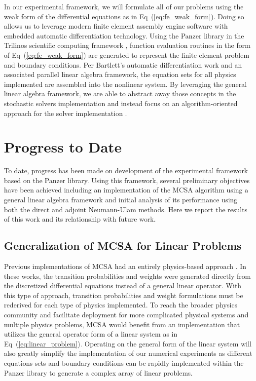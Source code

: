 In our experimental framework, we will formulate all of our problems
using the weak form of the differential equations as in
Eq~(\ref{eq:fe_weak_form}). Doing so allows us to leverage modern
finite element assembly engine software with embedded automatic
differentiation technology. Using the Panzer library in the Trilinos
scientific computing framework
\citep{notz_graph-based_2010,heroux_overview_2005}, function
evaluation routines in the form of Eq~(\ref{eq:fe_weak_form}) are
generated to represent the finite element problem and boundary
conditions. Per Bartlett's automatic differentiation work and an
associated parallel linear algebra framework, the equation sets for
all physics implemented are assembled into the nonlinear system. By
leveraging the general linear algebra framework, we are able to
abstract away those concepts in the stochastic solvers implementation
and instead focus on an algorithm-oriented approach for the solver
implementation \citep{musser_algorithm-oriented_1994}.

\section{Progress to Date}
\label{sec:progress}
To date, progress has been made on development of the experimental
framework based on the Panzer library. Using this framework, several
preliminary objectives have been achieved including an implementation
of the MCSA algorithm using a general linear algebra framework and
initial analysis of its performance using both the direct and adjoint
Neumann-Ulam methods. Here we report the results of this work and its
relationship with future work.

\subsection{Generalization of MCSA for Linear Problems}
\label{subsec:mcsa_generalization}
Previous implementations of MCSA had an entirely physics-based
approach \citep{evans_monte_2009,evans_monte_2012}. In these works,
the transition probabilities and weights were generated directly from
the discretized differential equations instead of a general linear
operator. With this type of approach, transition probabilities and
weight formulations must be rederived for each type of physics
implemented. To reach the broader physics community and facilitate
deployment for more complicated physical systems and multiple physics
problems, MCSA would benefit from an implementation that utilizes the
general operator form of a linear system as in
Eq~(\ref{eq:linear_problem}). Operating on the general form of the
linear system will also greatly simplify the implementation of our
numerical experiments as different equations sets and boundary
conditions can be rapidly implemented within the Panzer library to
generate a complex array of linear problems.

